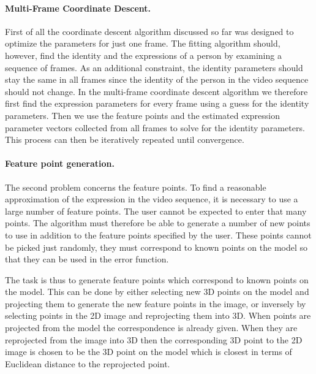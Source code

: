 \documentclass[11pt,a4paper,twoside]{report}
\begin{document}
\paragraph{Multi-Frame Coordinate Descent.} First of all the coordinate descent algorithm discussed so far was
designed to optimize the parameters for just one frame. The fitting algorithm
should, however, find the identity and the expressions of a person by examining a
sequence of frames. As an additional constraint, the identity parameters should
stay the same in all frames since the identity of the person in the video
sequence should not change. In the multi-frame coordinate descent algorithm we
therefore first find the expression
parameters for every frame using a guess for the identity parameters. Then we
use the feature points and the estimated expression parameter vectors collected from all frames
to solve for the identity parameters. This process can then be iteratively
repeated until convergence.

\paragraph{Feature point generation.} The second problem concerns the feature
points. To find a reasonable approximation of the expression in the
video sequence, it is necessary to use a large number of feature points. The user cannot
be expected to enter that many points. The algorithm must therefore be able to generate
a number of new points to use in addition to the feature points specified
by the user. These points cannot be picked just randomly, they must correspond
to known points on the model so that they can be used in the error
function. 

The task is thus to generate feature points which
correspond to known points on the model. This can be done by either selecting
new 3D points on the model and projecting them to generate the new feature
points in the image, or
inversely by selecting points in the 2D image and reprojecting them into 3D. When
points are projected from the model the correspondence is already given. When
they are reprojected from the image into 3D then the corresponding 3D point to the 2D image
is chosen to be the 3D point on the model which is closest
in terms of Euclidean distance to the reprojected point.
\end{document}
